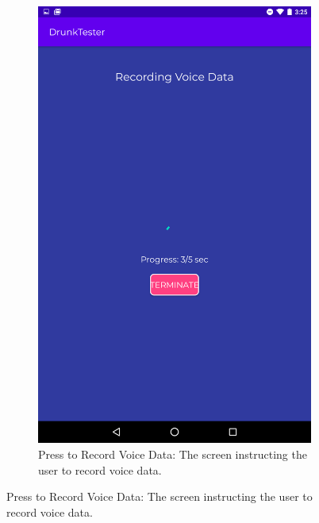 \documentclass[12pt,a4paper]{article}
\begin{document}
\begin{figure}[htb!]
\begin{subfigure}[b]{0.35\textwidth}
        \includegraphics[width=\textwidth]{materials/Recording_voice_data.png}
        \caption*{Press to Record Voice Data: The screen instructing the user to record voice data.}
    \end{subfigure}
\end{figure}

\newpage
\end{document}
